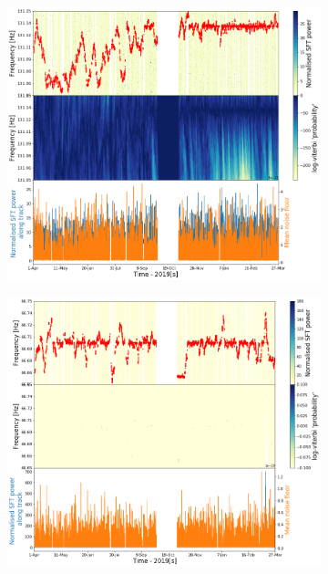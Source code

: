 \begin{figure}[hpt]
	\centering
	\begin{subfigure}[h]{0.49\textwidth}
		\includegraphics[width=\textwidth]{C6_detchar/track_F131_05_131_15.png}
		\caption{\label{detchar:soap:unknown:1}}
	\end{subfigure}
	\begin{subfigure}[h]{0.49\textwidth}
		\includegraphics[width=\textwidth]{C6_detchar/track_F66_65_66_75.png}
		\caption{\label{detchar:soap:unknown:2}}
	\end{subfigure}
	

\end{figure}
